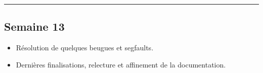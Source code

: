 \documentclass[12pt, letterpaper, twoside]{article}
\begin{document}
\rule{\textwidth}{0.4pt}

\subsection*{Semaine 13}
\begin{itemize}
	\item Résolution de quelques beugues et segfaults.
	\item Dernières finalisations, relecture et affinement de la documentation.
\end{itemize}
\end{document}
